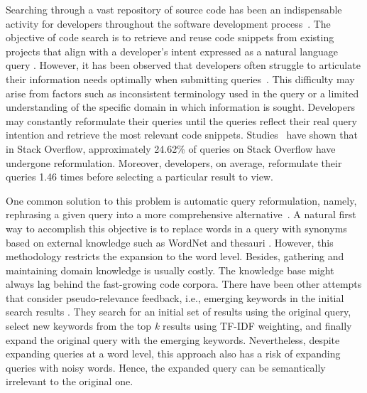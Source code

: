 \documentclass[sigconf,screen]{acmart}
\newcommand{\etal}{\hbox{et al.}\xspace}
\begin{document}
Searching through a vast repository of source code has been an indispensable activity for developers throughout the software development process~\cite{XiaBLKHX17}. The objective of code search is to retrieve and reuse code snippets from existing projects that align with a developer's intent expressed as a natural language query \cite{YanYCSJ20}.
However, it has been observed that developers often struggle to articulate their information needs optimally when submitting queries~\cite{KoMCA06, eberhart2022generating}. 
This difficulty may arise from factors such as inconsistent terminology used in the query or a limited understanding of the specific domain in which information is sought. 
Developers may constantly reformulate their queries until the queries reflect their real query intention and retrieve the most relevant code snippets. 
Studies~\cite{sequer} have shown that in Stack Overflow, approximately 24.62\% of queries on Stack Overflow have undergone reformulation. Moreover, developers, on average, reformulate their queries 1.46 times before selecting a particular result to view.

One common solution to this problem is automatic query reformulation, namely, rephrasing a given query into a more comprehensive alternative~\cite{HaiducBMOLM13, liu2022formulate}. 
A natural first way to accomplish this objective is to replace words in a query with synonyms based on external knowledge such as WordNet and thesauri \cite{sesimilarwords, SWordNet, lusearch, li2022cooperative}. However, this methodology restricts the expansion to the word level. Besides, gathering and maintaining domain knowledge is usually costly. The knowledge base might always lag behind the fast-growing code corpora. 
There have been other attempts that consider pseudo-relevance feedback, i.e., emerging keywords in the initial search results \cite{nlp2api, pseudo, huang2017query, zhu2022lol}. They search for an initial set of results using the original query, select new keywords from the top \textit{k} results using TF-IDF weighting, and finally expand the original query with the emerging keywords. 
Nevertheless, despite expanding queries at a word level, this approach also has a risk of expanding queries with noisy words. Hence, the expanded query can be semantically irrelevant to the original one.
\end{document}
